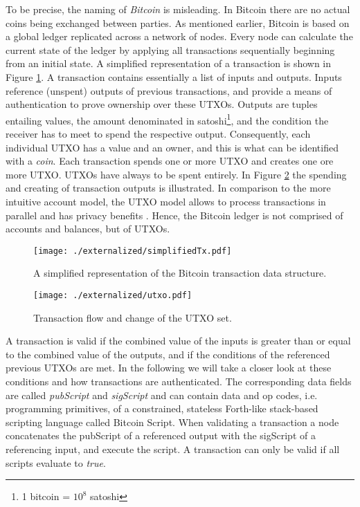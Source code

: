 To be precise, the naming of \emph{Bitcoin} is misleading. In Bitcoin there are no actual coins being exchanged between parties. As mentioned earlier, Bitcoin is based on a global ledger replicated across a network of nodes. Every node can calculate the current state of the ledger by applying all transactions sequentially beginning from an initial state. A simplified representation of a transaction is shown in Figure \ref{fig:bitcointx}. 
A transaction contains essentially a list of inputs and outputs. Inputs reference (unspent) outputs of previous transactions, and provide a means of authentication to prove ownership over these \ac{UTXO}s. Outputs are tuples entailing values, the amount denominated in satoshi\footnote{1 bitcoin = $10^8$ satoshi}, and the condition the receiver has to meet to spend the respective output. Consequently, each individual \ac{UTXO} has a value and an owner, and this is what can be identified with a \emph{coin}. Each transaction spends one or more \ac{UTXO} and creates one ore more \ac{UTXO}. \ac{UTXO}s have always to be spent entirely. In Figure \ref{fig:utxo} the spending and creating of transaction outputs is illustrated.
In comparison to the more intuitive account model, the \ac{UTXO} model allows to process transactions in parallel and has privacy benefits \parencite{buterin2016utxo}. Hence, the Bitcoin ledger is not comprised of accounts and balances, but of \ac{UTXO}s. 

\begin{figure}
\centering
\texttt{[image: ./externalized/simplifiedTx.pdf]}
\caption{A simplified representation of the Bitcoin transaction data structure.}
\label{fig:bitcointx}
\end{figure}

\begin{figure}
\centering
\texttt{[image: ./externalized/utxo.pdf]}
\caption{Transaction flow and change of the \ac{UTXO} set.}
\label{fig:utxo}
\end{figure}

A transaction is valid if the combined value of the inputs is greater than or equal to the combined value of the outputs, and if the conditions of the referenced previous \ac{UTXO}s are met.
In the following we will take a closer look at these conditions and how transactions are authenticated. The corresponding data fields are called \emph{pubScript} and \emph{sigScript} and can contain data and op codes, i.e. programming primitives, of a constrained, stateless Forth-like stack-based scripting language called Bitcoin Script. 
When validating a transaction a node concatenates the pubScript of a referenced output with the sigScript of a referencing input, and execute the script. A transaction can only be valid if all scripts evaluate to \emph{true}. 

